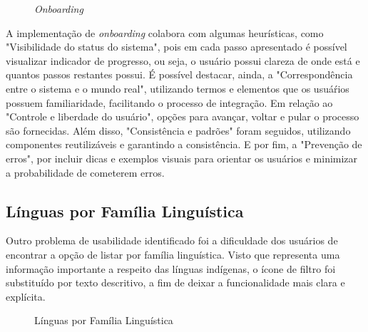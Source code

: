 \begin{figure}[h!]
	\centering
	\caption{\textit{Onboarding}}
	\label{fig22}
\end{figure}

A implementação de \textit{onboarding} colabora com algumas heurísticas, como "Visibilidade do status do sistema", pois em cada passo apresentado é possível visualizar indicador de progresso, ou seja, 
o usuário possui clareza de onde está e quantos passos restantes possui. É possível destacar, ainda, a "Correspondência entre o sistema e o mundo real", utilizando termos e elementos que os usuáŕios 
possuem familiaridade, facilitando o processo de integração. Em relação ao "Controle e liberdade do usuário", opções para avançar, voltar e pular o processo são fornecidas. Além disso, "Consistência e 
padrões" foram seguidos, utilizando componentes reutilizáveis e garantindo a consistência. E por fim, a "Prevenção de erros", por incluir dicas e exemplos visuais para orientar os usuários e  minimizar 
a probabilidade de cometerem erros.

\subsection{Línguas por Família Linguística}
\label{sec:Familia Linguistica}
Outro problema de usabilidade identificado foi a dificuldade dos usuários de encontrar a opção de listar por família linguística. Visto que representa uma informação importante a respeito das línguas indígenas, 
o ícone de filtro foi substituído por texto descritivo, a fim de deixar a funcionalidade mais clara e explícita.

\begin{figure}[h!]
	\centering
	\caption{Línguas por Família Linguística}
	\label{fig23}
\end{figure}

